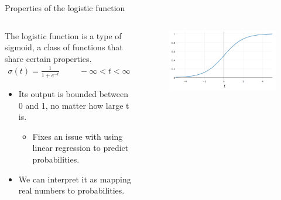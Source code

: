 \documentclass[aspectratio=169]{../latex_main/tntbeamer}  %
\begin{document}
	
	\begin{frame}{Properties of the logistic function}
	   
	   \begin{columns}
	    
	   \begin{column}{.5\textwidth}
	   The logistic function is a type of sigmoid, a class of functions that share certain properties.
	   \begin{align*}
	       \sigma (t) = \frac{1}{1 + e^{-t}} \hspace{1cm} -\infty < t < \infty
	   \end{align*}
	   \begin{itemize}
	       \item Its output is bounded between 0 and 1, no matter how large t is.
	       \begin{itemize}
	           \item Fixes an issue with using linear regression to predict probabilities.
	       \end{itemize}
	       \item We can interpret it as mapping real numbers to probabilities.
	   \end{itemize}
	    \end{column}
	    \begin{column}{.5\textwidth}
	        \begin{figure}
	            \centering
	            \includegraphics[scale=.65]{Bild9}
	        \end{figure}
	    \end{column}
	    
	    \end{columns}
	\end{frame}
	
\end{document}
